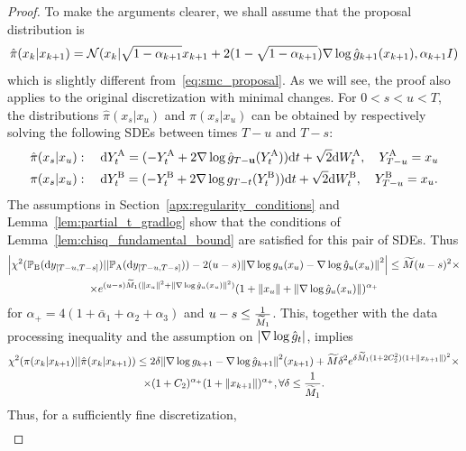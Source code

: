 \documentclass{article}
\theoremstyle{plain}
\theoremstyle{definition}
\theoremstyle{remark}
\begin{document}
\begin{proof}
	To make the arguments clearer, we shall assume that the proposal distribution is
	\begin{equation*}
		\hat\pi(x_k|x_{k+1}) = \mathcal N(x_k|\sqrt{1-\alpha_{k+1}} x_{k+1} + 2(1-\sqrt{1-\alpha_{k+1}}) \nabla\log \hat g_{k+1}(x_{k+1}), \alpha_{k+1}I)
	\end{equation*}
	which is slightly different from~\eqref{eq:smc_proposal}. As we will see, the proof also applies to the original discretization with minimal changes. For $0<s<u<T$, the distributions $\hat \pi(x_s|x_u)$ and $\pi(x_s|x_u)$ can be obtained by respectively solving the following SDEs between times $T-u$ and $T-s$:
	\newcommand{\yya}{Y^{\mathrm{A}}}
	\newcommand{\yyb}{Y^{\mathrm{B}}}
	\begin{align*}
		 & \hat\pi(x_s|x_u):\quad \dd \yya_t = (-\yya_t + 2\gradlog \hat g_{T-\mathbf u}(\yya_t)) \dd t + \sqrt 2 \dd \wwa_t,\quad \yya_{T-u}=x_u \\
		 & \pi(x_s|x_u):\quad \dd \yyb_t = (-\yyb_t + 2\gradlog g_{T-t}(\yyb_t)) \dd t + \sqrt 2 \dd \wwb_t,\quad \yyb_{T-u}=x_u.
	\end{align*}
	The assumptions in Section~\ref{apx:regularity_conditions} and Lemma~\ref{lem:partial_t_gradlog} show that the conditions of Lemma~\ref{lem:chisq_fundamental_bound} are satisfied for this pair of SDEs. Thus
	\begin{multline*}
		\abs{\chi^2(
				\mathbb{P}_{\mathrm{B}}(\dd y_{[T-u, T-s]})
			||
				\mathbb{P}_{\mathrm{A}}(\dd y_{[T-u, T-s]})
			) - 2(u-s)\norm{\nabla\log g_u(x_u) - \nabla\log \hat g_u(x_u)}^2} \leq \widetilde M(u-s)^2 \times \\ \times e^{(u-s)\widetilde M_1 (\norm{x_u}^2 + \norm{\nabla\log \hat g_u(x_u)}^2)} (1+\norm{x_u}+\norm{\nabla\log \hat g_u(x_u)})^{\alpha_+}
	\end{multline*}
	for $\alpha_+ = 4(1+\bar\alpha_1+\alpha_2+\alpha_3)$ and $u-s\leq \frac{1}{\widetilde M_1}$. This, together with the data processing inequality and the assumption on $|\nabla\log \hat g_t|$, implies
	\begin{multline*}
		\chi^2(\pi(x_k|x_{k+1})||\hat \pi(x_k|x_{k+1})) \leq 2\delta\norm{\nabla\log g_{k+1}-\nabla\log \hat g_{k+1}}^2(x_{k+1}) + \widetilde M \delta^2 e^{\delta\widetilde M_1(1+2C_2^2)(1+\norm{x_{k+1}})^2} \times \\ \times (1+C_2)^{\alpha_+}(1+\norm{x_{k+1}})^{\alpha_+}, \forall \delta \leq \frac{1}{\widetilde M_1}.
	\end{multline*}
	Thus, for a sufficiently fine discretization,
	\begin{multline}

\end{multline}
\end{proof}
\end{document}
